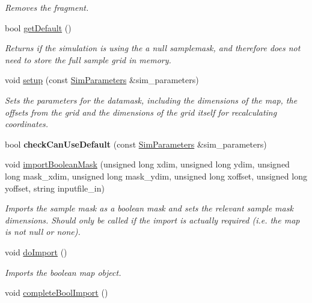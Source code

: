 \begin{DoxyCompactItemize}
\begin{DoxyCompactList}\small\item\em Removes the fragment. \end{DoxyCompactList}\item 
bool \hyperlink{class_data_mask_a093364b6da9442f7c4945b5a06cfe3af}{get\+Default} ()
\begin{DoxyCompactList}\small\item\em Returns if the simulation is using the a null samplemask, and therefore does not need to store the full sample grid in memory. \end{DoxyCompactList}\item 
void \hyperlink{class_data_mask_ab6a4e6f63856f96805ddc79022c47104}{setup} (const \hyperlink{struct_sim_parameters}{Sim\+Parameters} \&sim\+\_\+parameters)
\begin{DoxyCompactList}\small\item\em Sets the parameters for the datamask, including the dimensions of the map, the offsets from the grid and the dimensions of the grid itself for recalculating coordinates. \end{DoxyCompactList}\item 
bool {\bfseries check\+Can\+Use\+Default} (const \hyperlink{struct_sim_parameters}{Sim\+Parameters} \&sim\+\_\+parameters)\hypertarget{class_data_mask_ae5bf5df7975431338e3ea757e6f2fac9}{}\label{class_data_mask_ae5bf5df7975431338e3ea757e6f2fac9}

\item 
void \hyperlink{class_data_mask_aac63b47c3688db359760f6134d30f239}{import\+Boolean\+Mask} (unsigned long xdim, unsigned long ydim, unsigned long mask\+\_\+xdim, unsigned long mask\+\_\+ydim, unsigned long xoffset, unsigned long yoffset, string inputfile\+\_\+in)
\begin{DoxyCompactList}\small\item\em Imports the sample mask as a boolean mask and sets the relevant sample mask dimensions. Should only be called if the import is actually required (i.\+e. the map is not null or none). \end{DoxyCompactList}\item 
void \hyperlink{class_data_mask_a85f7b85bb4ac54aa884a8a06f1d35d1b}{do\+Import} ()\hypertarget{class_data_mask_a85f7b85bb4ac54aa884a8a06f1d35d1b}{}\label{class_data_mask_a85f7b85bb4ac54aa884a8a06f1d35d1b}

\begin{DoxyCompactList}\small\item\em Imports the boolean map object. \end{DoxyCompactList}\item 
void \hyperlink{class_data_mask_a09a24a15ad49851e8f344150a9109dd2}{complete\+Bool\+Import} ()\hypertarget{class_data_mask_a09a24a15ad49851e8f344150a9109dd2}{}\label{class_data_mask_a09a24a15ad49851e8f344150a9109dd2}


\end{DoxyCompactItemize}
